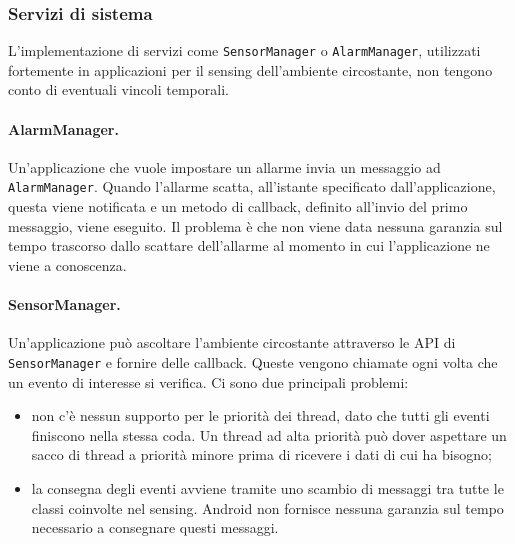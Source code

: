 \subsubsection{Servizi di sistema}
L'implementazione di servizi come \texttt{SensorManager} o \texttt{AlarmManager}, utilizzati fortemente in applicazioni per il sensing dell'ambiente circostante, non tengono conto di eventuali vincoli temporali. 

\paragraph{AlarmManager.} Un'applicazione che vuole impostare un allarme invia un messaggio ad \texttt{AlarmManager}. Quando l'allarme scatta, all'istante specificato dall'applicazione, questa viene notificata e un metodo di callback, definito all'invio del primo messaggio, viene eseguito. Il problema è che non viene data nessuna garanzia sul tempo trascorso dallo scattare dell'allarme al momento in cui l'applicazione ne viene a conoscenza. 

\paragraph{SensorManager.}
Un'applicazione può ascoltare l'ambiente circostante attraverso le API di \texttt{SensorManager} e fornire delle callback. Queste vengono chiamate ogni volta che un evento di interesse si verifica. Ci sono due principali problemi: 
\begin{itemize}
	\item non c'è nessun supporto per le priorità dei thread, dato che tutti gli eventi finiscono nella stessa coda. Un thread ad alta priorità può dover aspettare un sacco di thread a priorità minore prima di ricevere i dati di cui ha bisogno;
	\item la consegna degli eventi avviene tramite uno scambio di messaggi tra tutte le classi coinvolte nel sensing. Android non fornisce nessuna garanzia sul tempo necessario a consegnare questi messaggi.
\end{itemize}